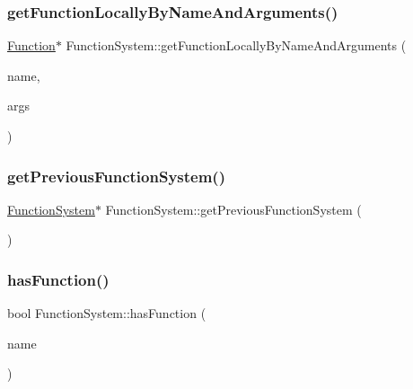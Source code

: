 \subsubsection{\texorpdfstring{get\+Function\+Locally\+By\+Name\+And\+Arguments()}{getFunctionLocallyByNameAndArguments()}}
{\footnotesize\ttfamily \hyperlink{classFunction}{Function}$\ast$ Function\+System\+::get\+Function\+Locally\+By\+Name\+And\+Arguments (\begin{DoxyParamCaption}\item[{std\+::string}]{name,  }\item[{std\+::vector$<$ \hyperlink{classVarType}{Var\+Type} $>$}]{args }\end{DoxyParamCaption})}

\mbox{\label{classFunctionSystem_a2c6914067d4eca5f9c039bed454d072f}} 
\subsubsection{\texorpdfstring{get\+Previous\+Function\+System()}{getPreviousFunctionSystem()}}
{\footnotesize\ttfamily \hyperlink{classFunctionSystem}{Function\+System}$\ast$ Function\+System\+::get\+Previous\+Function\+System (\begin{DoxyParamCaption}{ }\end{DoxyParamCaption})}

\mbox{\label{classFunctionSystem_a7248f494dea505ffaa2108b202f1efcb}} 
\subsubsection{\texorpdfstring{has\+Function()}{hasFunction()}\hspace{0.1cm}{\footnotesize\ttfamily [1/2]}}
{\footnotesize\ttfamily bool Function\+System\+::has\+Function (\begin{DoxyParamCaption}\item[{std\+::string}]{name }\end{DoxyParamCaption})}

\mbox{\label{classFunctionSystem_a68dfda320aa807a9f1d16e4cfd4f25fb}} 
